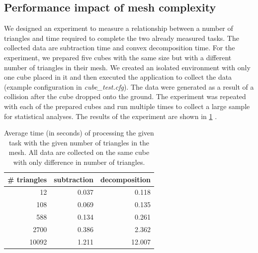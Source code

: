 \subsection{Performance impact of mesh complexity}
\label{sec:triangleperformance}
We designed an experiment to measure a relationship between a number of triangles and time required to complete the two already measured tasks. The collected data are subtraction time and convex decomposition time. For the experiment, we prepared five cubes with the same size but with a different number of triangles in their mesh. We created an isolated environment with only one cube placed in it and then executed the application to collect the data (example configuration in \emph{cube\_test.cfg}). The data were generated as a result of a collision after the cube dropped onto the ground. The experiment was repeated with each of the prepared cubes and run multiple times to collect a large sample for statistical analyses. The results of the experiment are shown in \cref{tab:subtraction-decomposition} . 
\begin{table}
\centering
\begin{tabular}{r r r}
\# triangles & subtraction & decomposition \\
\hline
12 & 0.037 & 0.118 \\
108 & 0.069 & 0.135 \\
588 & 0.134 & 0.261 \\ 
2700 & 0.386 & 2.362 \\ 
10092 & 1.211 & 12.007 \\
\end{tabular}
\caption{Average time (in seconds) of processing the given task with the given number of triangles in the mesh. All data are collected on the same cube with only difference in number of triangles.}
\label{tab:subtraction-decomposition}
\end{table}

